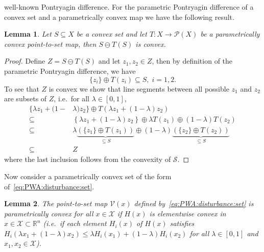 \documentclass[letterpaper, 10pt, conference]{ieeeconf} %
\newtheorem{thm}{Lemma}[section]
\begin{document}
    well-known Pontryagin difference.
    For the parametric Pontryagin difference of a convex set and a parametrically convex map we have the following result.
%
    \begin{thm}\label{thm:convexity:of:pontryagin:difference}
      Let $S\subseteq X$ be a convex set and let $T:X\rightarrow\mathcal P(X)$ be a parametrically convex point-to-set
      map, then $S\ominus T(S)$ is convex. 
    \end{thm}
%
    \begin{proof}
      Define $ Z =  S\ominus T( S)$ and let $z_1,z_2\in Z$, then
      by definition of the parametric Pontryagin difference, we have
\[%
        \{z_i\} \oplus T(z_i) \subseteq S,\; i=1,2.
\]%
      To see that $ Z$ is convex we show that line segments between
      all possible $z_1$ and $z_2$ are subsets of $ Z$, i.e.~for all $\lambda \in [0,1]$,
      \[\begin{aligned}
        \{ \lambda z_1 + (1-&\lambda)z_2
        \}\oplus T\left( \lambda z_1 + (1-\lambda)z_2\right)\\
        \subseteq&\left\{ \lambda z_1 + (1-\lambda)z_2
        \right\}\oplus \lambda T(z_1) \oplus (1-\lambda)
         T(z_2)\\
        \subseteq &\lambda\underbrace{(\{z_1\}\oplus T(z_1))}_{\subseteq S}\oplus
        (1-\lambda)\underbrace{(\{z_2\}\oplus T(z_2))}_{\subseteq S}\\
        \subseteq& Z
        \end{aligned}\]
      where the last inclusion follows from the convexity of $\mathcal S$.
    \end{proof}
%
%
Now consider a parametrically convex set of the form of~\eqref{eq:PWA:disturbance:set}.
    \begin{thm}\label{thm:convex:parametric:set}
      The point-to-set map $\mathcal V (x)$ defined by~\eqref{eq:PWA:disturbance:set} is parametrically 
      convex for all $x\in \mathcal X$ if $H(x)$ is elementwise convex in $x\in \mathcal X\subset \mathbb R^n$ (i.e.~if each element $H_i(x)$ of $H(x)$ satisfies
    $H_i(\lambda x_1+(1-\lambda)x_2)\leq \lambda H_i(x_1)+(1-\lambda)H_i(x_2)$ for all    $\lambda\in[0,1]$ and $x_1, x_2\in\mathcal X$).
    \end{thm}
\end{document}
